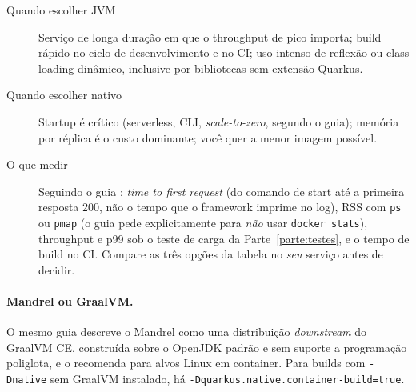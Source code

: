 \begin{description}
\item[Quando escolher JVM] Serviço de longa duração em que o throughput
  de pico importa; build rápido no ciclo de desenvolvimento e no CI; uso
  intenso de reflexão ou class loading dinâmico, inclusive por
  bibliotecas sem extensão Quarkus.
\item[Quando escolher nativo] Startup é crítico (serverless, CLI,
  \emph{scale-to-zero}, segundo o guia); memória por réplica é o custo
  dominante; você quer a menor imagem possível.
\item[O que medir] Seguindo o guia :
  \emph{time to first request} (do comando de start até a primeira
  resposta 200, não o tempo que o framework imprime no log), RSS com
  \texttt{ps} ou \texttt{pmap} (o guia pede explicitamente para
  \emph{não} usar \texttt{docker stats}), throughput e p99 sob o teste
  de carga da Parte~\ref{parte:testes}, e o tempo de build no CI. Compare as três
  opções da tabela no \emph{seu} serviço antes de decidir.
\end{description}

\paragraph{Mandrel ou GraalVM.}
O mesmo guia descreve o Mandrel como uma distribuição \emph{downstream}
do GraalVM CE, construída sobre o OpenJDK padrão e sem suporte a
programação poliglota, e o recomenda para alvos Linux em container.
Para builds com \texttt{-Dnative} sem GraalVM instalado, há
\texttt{-Dquarkus.native.container-build=true}.
